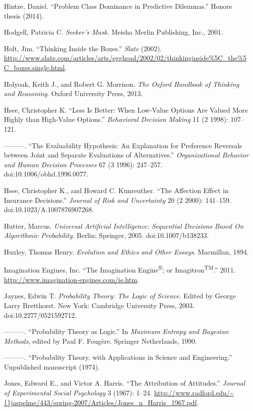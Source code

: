 {
 Hintze, Daniel. ``Problem Class Dominance in
Predictive Dilemmas.'' Honors thesis (2014).}

{
 Hodgell, Patricia C. \textit{Seeker's Mask}.
Meisha Merlin Publishing, Inc., 2001.}

{
 Holt, Jim. ``Thinking Inside the
Boxes.'' \textit{Slate} (2002).
\url{http://www.slate.com/articles/arts/egghead/2002/02/thinkinginside\%5C\_the\%5C\_boxes.single.html}.}

{
 Holyoak, Keith J., and Robert G. Morrison. \textit{The Oxford
Handbook of Thinking and Reasoning}. Oxford University Press, 2013.}

{
 Hsee, Christopher K. ``Less Is Better: When
Low-Value Options Are Valued More Highly than High-Value
Options.'' \textit{Behavioral Decision Making} 11 (2
1998): 107--121.}

{
 {}---{}---{}---. ``The Evaluability Hypothesis:
An Explanation for Preference Reversals between Joint and Separate
Evaluations of Alternatives.'' \textit{Organizational
Behavior and Human Decision Processes} 67 (3 1996): 247--257.
doi:10.1006/obhd.1996.0077.}

{
 Hsee, Christopher K., and Howard C. Kunreuther.
``The Affection Effect in Insurance
Decisions.'' \textit{Journal of Risk and Uncertainty}
20 (2 2000): 141--159. doi:10.1023/A:1007876907268.}

{
 Hutter, Marcus. \textit{Universal Artificial Intelligence:
Sequential Decisions Based On Algorithmic Probability}. Berlin:
Springer, 2005. doi:10.1007/b138233.}

{
 Huxley, Thomas Henry. \textit{Evolution and Ethics and Other
Essays}. Macmillan, 1894.}

{
 Imagination Engines, Inc. ``The Imagination
Engine\textsuperscript{®}; or
Imagitron\textsuperscript{TM}.'' 2011.
\url{http://www.imagination-engines.com/ie.htm}.}

{
 Jaynes, Edwin T. \textit{Probability Theory: The Logic of
Science}. Edited by George Larry Bretthorst. New York: Cambridge
University Press, 2003. doi:10.2277/0521592712.}

{
 {}---{}---{}---. ``Probability Theory as
Logic.'' In \textit{Maximum Entropy and Bayesian
Methods}, edited by Paul F. Fougère. Springer Netherlands, 1990.}

{
 {}---{}---{}---. ``Probability Theory, with
Applications in Science and Engineering.''
Unpublished manuscript (1974).}

{
 Jones, Edward E., and Victor A. Harris. ``The
Attribution of Attitudes.'' \textit{Journal of
Experimental Social Psychology} 3 (1967): 1--24.
\url{http://www.radford.edu/\~{}jaspelme/443/spring-2007/Articles/Jones\_n\_Harris\_1967.pdf}.}

